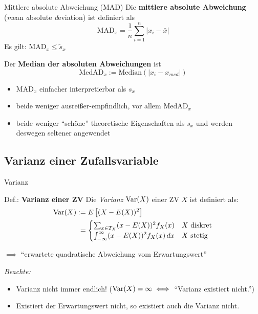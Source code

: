 \documentclass[
  10pt,
  ignorenonframetext,
]{beamer}
\providecommand{\tightlist}{%
  \setlength{\itemsep}{0pt}\setlength{\parskip}{0pt}}
\begin{document}
\begin{frame}{Mittlere absolute Abweichung (MAD)}
\label{mittlere-absolute-abweichung-mad}
Die \textbf{mittlere absolute Abweichung} (\emph{m}ean \emph{a}bsolute
\emph{d}eviation) ist definiert als \begin{equation*}
    \text{MAD}_x= \frac{1}{n} \sum_{i=1}^n|x_i - \bar x|
\end{equation*} Es gilt: MAD\(_x \leq \widetilde s_x\)

Der \textbf{Median der absoluten Abweichungen} ist \begin{equation*}
    \text{MedAD}_x := \text{Median}(|x_i - x_{med}|) 
\end{equation*}

\begin{itemize}
\tightlist
\item
  \(\text{MAD}_x\) einfacher interpretierbar als \(s_x\)
\item
  beide weniger ausreißer-empfindlich, vor allem \(\text{MedAD}_x\)
\item
  beide weniger ``schöne'' theoretische Eigenschaften als \(s_x\) und
  werden deswegen seltener angewendet
\end{itemize}
\end{frame}

\subsection{Varianz einer
Zufallsvariable}\label{varianz-einer-zufallsvariable}

\begin{frame}{Varianz}
\label{varianz}
\begin{block}{Def.: \textbf{Varianz einer ZV}}
\label{def.-varianz-einer-zv}
Die \emph{Varianz} \(\operatorname{Var}(X)\) einer ZV \(X\) ist definiert als:
\begin{align*}
\operatorname{Var}(X) &:= E\left[(X -E(X))^2\right] \\
        &\phantom{:}= \begin{cases} 
             \sum_{x \in T_X} (x - E(X))^2 f_X(x) & X \text{ diskret} \\
              \int_{-\infty}^\infty (x - E(X))^2 f_X(x) \,dx & X \text{ stetig}
            \end{cases}
\end{align*}
\end{block}

\(\implies\) ``erwartete quadratische Abweichung vom Erwartungswert''

\emph{Beachte:}

\begin{itemize}
\tightlist
\item
  Varianz nicht immer endlich! (\(\operatorname{Var}(X) = \infty \iff\) ``Varianz
  existiert nicht.'')
\item
  Existiert der Erwartungswert nicht, so existiert auch die Varianz
  nicht.
\end{itemize}
\end{frame}
\end{document}
